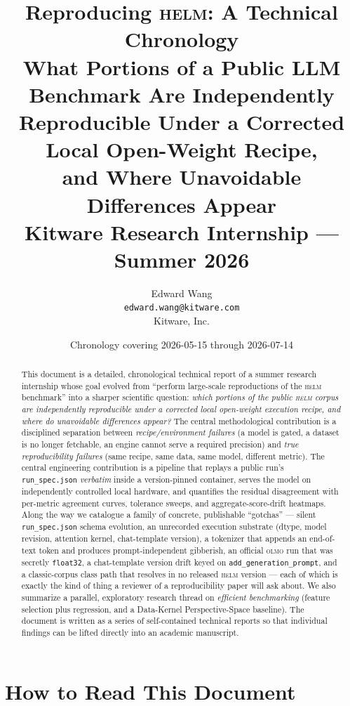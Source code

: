 \documentclass[11pt]{report}
\title{\bfseries Reproducing \textsc{helm}: A Technical Chronology\\[4pt]
  \large What Portions of a Public LLM Benchmark Are Independently\\
  Reproducible Under a Corrected Local Open-Weight Recipe,\\
  and Where Unavoidable Differences Appear\\[10pt]
  \normalsize Kitware Research Internship --- Summer 2026}
\author{Edward Wang\\ \texttt{edward.wang@kitware.com}\\[4pt]
  \small Kitware, Inc.}
\date{Chronology covering 2026-05-15 through 2026-07-14}
\newcommand{\code}[1]{\texttt{#1}}
\newcommand{\file}[1]{\texttt{#1}}
\begin{document}
\maketitle

\begin{abstract}
\noindent
This document is a detailed, chronological technical report of a summer research
internship whose goal evolved from ``perform large-scale reproductions of the
\textsc{helm} benchmark'' into a sharper scientific question: \emph{which portions
of the public \textsc{helm} corpus are independently reproducible under a corrected
local open-weight execution recipe, and where do unavoidable differences appear?}
The central methodological contribution is a disciplined separation between
\emph{recipe/environment failures} (a model is gated, a dataset is no longer
fetchable, an engine cannot serve a required precision) and \emph{true
reproducibility failures} (same recipe, same data, same model, different metric).
The central engineering contribution is a pipeline that replays a public run's
\file{run\_spec.json} \emph{verbatim} inside a version-pinned container, serves the
model on independently controlled local hardware, and quantifies the residual
disagreement with per-metric agreement curves, tolerance sweeps, and
aggregate-score-drift heatmaps. Along the way we catalogue a family of concrete,
publishable ``gotchas'' --- silent \file{run\_spec.json} schema evolution, an
unrecorded execution substrate (dtype, model revision, attention kernel,
chat-template version), a tokenizer that appends an end-of-text token and produces
prompt-independent gibberish, an official \textsc{olmo} run that was secretly
\code{float32}, a chat-template version drift keyed on \code{add\_generation\_prompt},
and a classic-corpus class path that resolves in no released \textsc{helm} version ---
each of which is exactly the kind of thing a reviewer of a reproducibility paper will
ask about. We also summarize a parallel, exploratory research thread on
\emph{efficient benchmarking} (feature selection plus regression, and a Data-Kernel
Perspective-Space baseline). The document is written as a series of self-contained
technical reports so that individual findings can be lifted directly into an
academic manuscript.
\end{abstract}

\tableofcontents

\chapter{How to Read This Document}
\end{document}
